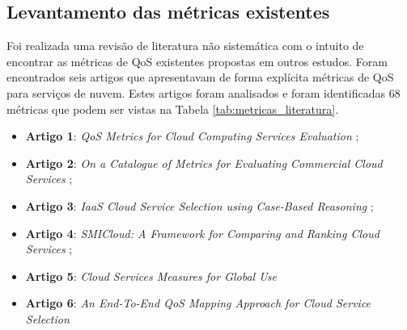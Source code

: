 \documentclass[conference]{IEEEtran}
\begin{document}
  \subsection{Levantamento das métricas existentes}
      
      Foi realizada uma revisão de literatura não sistemática com o intuito de encontrar as métricas de QoS existentes
      propostas em outros estudos. Foram encontrados seis artigos que apresentavam de forma explícita métricas de QoS para
      serviços de nuvem.  Estes artigos foram analisados e foram identificadas 68 métricas que podem ser vistas na Tabela \ref{tab:metricas_literatura}.
      
      \begin{itemize}
       \item \textbf{Artigo 1}: \textit{QoS Metrics for Cloud Computing Services Evaluation} \cite{bardsiri2014};
       \item \textbf{Artigo 2}: \textit{On a Catalogue of Metrics for Evaluating Commercial Cloud Services} \cite{li2012};
       \item \textbf{Artigo 3}: \textit{IaaS Cloud Service Selection using Case-Based Reasoning} \cite{soltani2016};
       \item \textbf{Artigo 4}: \textit{SMICloud: A Framework for Comparing and Ranking Cloud Services} \cite{garg2011};
       \item \textbf{Artigo 5}: \textit{Cloud Services Measures for Global Use} \cite{siegel2012cloud}
       \item \textbf{Artigo 6}: \textit{An End-To-End QoS Mapping Approach for Cloud Service Selection} \cite{karim2013}
      \end{itemize}
      
\end{document}

